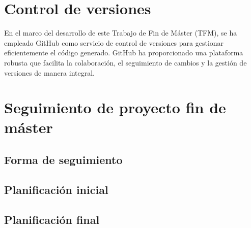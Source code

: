 \documentclass[12pt,a4paper,onecolumn,oneside]{report}
\begin{document}
	

	



\nocite{*}



\renewcommand{\appendixname}{Anexo}
\appendix

\chapter{Control de versiones}
\label{Control de versiones}

En el marco del desarrollo de este Trabajo de Fin de Máster (TFM), se ha empleado GitHub como servicio de control de versiones para gestionar eficientemente el código generado. GitHub ha proporcionado una plataforma robusta que facilita la colaboración, el seguimiento de cambios y la gestión de versiones de manera integral.


\chapter{Seguimiento de proyecto fin de máster}
\label{Seguimiento de proyecto fin de máster}


\section{Forma de seguimiento}

\section{Planificación inicial}

\section{Planificación final}
\end{document}
